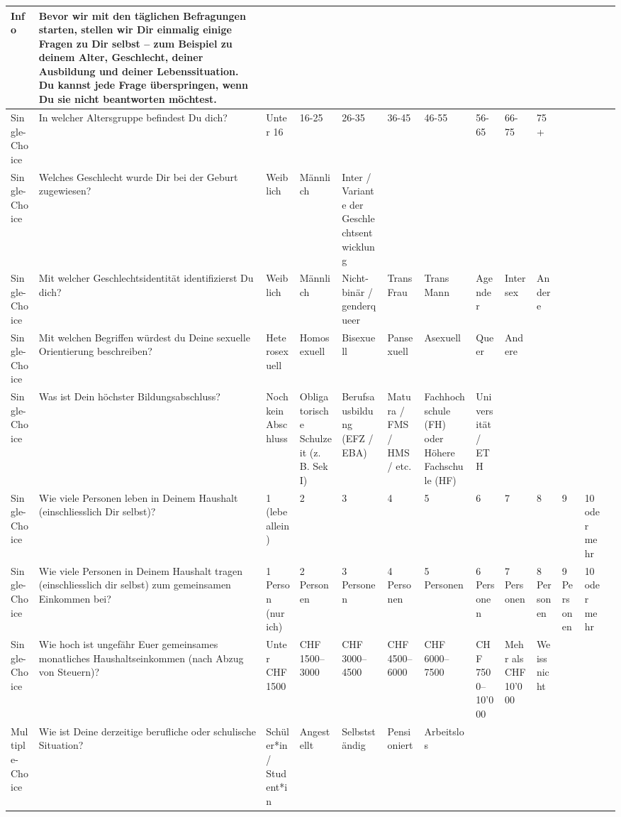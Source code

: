 \begin{appendices}
\begin{landscape}
\begin{longtable}{p{1.2cm} p{5.8cm} *{11}{p{1cm}}}
Info & Bevor wir mit den täglichen Befragungen starten, stellen wir Dir einmalig einige Fragen zu Dir selbst – zum Beispiel zu deinem Alter, Geschlecht, deiner Ausbildung und deiner Lebenssituation. Du kannst jede Frage überspringen, wenn Du sie nicht beantworten möchtest. &  &  &  &  &  &  &  &  &  &  & \\
\midrule
Single-Choice & In welcher Altersgruppe befindest Du dich? & Unter 16 & 16-25 & 26-35 & 36-45 & 46-55 & 56-65 & 66-75 & 75+ &  &  & \\
\midrule
Single-Choice & Welches Geschlecht wurde Dir bei der Geburt zugewiesen? & Weiblich & Männlich & Inter / Variante der Geschlechtsentwicklung &  &  &  &  &  &  &  & \\
\midrule
Single-Choice & Mit welcher Geschlechtsidentität identifizierst Du dich? & Weiblich & Männlich & Nicht-binär / genderqueer & Trans Frau & Trans Mann & Agender & Intersex & Andere &  &  & \\
\midrule
Single-Choice & Mit welchen Begriffen würdest du Deine sexuelle Orientierung beschreiben? & Heterosexuell & Homosexuell & Bisexuell & Pansexuell & Asexuell & Queer & Andere &  &  &  & \\
\midrule
Single-Choice & Was ist Dein höchster Bildungsabschluss? & Noch kein Abschluss & Obligatorische Schulzeit (z. B. Sek I) & Berufsausbildung (EFZ / EBA) & Matura / FMS / HMS / etc. & Fachhochschule (FH) oder Höhere Fachschule (HF) & Universität / ETH &  &  &  &  & \\
\midrule
Single-Choice & Wie viele Personen leben in Deinem Haushalt (einschliesslich Dir selbst)? & 1 (lebe allein) & 2 & 3 & 4 & 5 & 6 & 7 & 8 & 9 & 10 oder mehr & \\
\midrule
Single-Choice & Wie viele Personen in Deinem Haushalt tragen (einschliesslich dir selbst) zum gemeinsamen Einkommen bei? & 1 Person (nur ich) & 2 Personen & 3 Personen & 4 Personen & 5 Personen & 6 Personen & 7 Personen & 8 Personen & 9 Personen & 10 oder mehr & \\
\midrule
Single-Choice & Wie hoch ist ungefähr Euer gemeinsames monatliches Haushaltseinkommen (nach Abzug von Steuern)? & Unter CHF 1500 & CHF 1500–3000 & CHF 3000–4500 & CHF 4500–6000 & CHF 6000–7500 & CHF 7500–10'000 & Mehr als CHF 10'000 & Weiss nicht &  &  & \\
\midrule
Multiple-Choice & Wie ist Deine derzeitige berufliche oder schulische Situation? & Schüler*in / Student*in & Angestellt & Selbstständig & Pensioniert & Arbeitslos &  &  &  &  &  & \\

\end{longtable}
\end{landscape}
\end{appendices}
